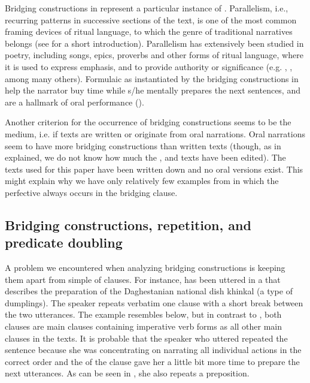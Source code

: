 \documentclass[output=paper]{LSP/langsci}
\begin{document}
Bridging constructions in  represent a particular instance of . Parallelism, i.e., recurring patterns in successive sections of the text, is one of the most common framing devices of ritual language, to which the genre of traditional narratives belongs (see \citealt{Frog.Tarkka.2017} for a short introduction). Parallelism has extensively been studied in poetry, including songs, epics, proverbs and other forms of ritual language, where it is used to express emphasis, and to provide authority or significance (e.g. \citealt{Jakobson.1966}, \citealt{Fox.2014}, among many others). Formulaic  as instantiated by the bridging constructions in  help the narrator buy time while s/he mentally prepares the next sentences, and are a hallmark of oral performance (\citealt{Fabb.2015}).

Another criterion for the occurrence of bridging constructions seems to be the medium, i.e. if texts are written or originate from oral narrations. Oral narrations seem to have more bridging constructions than written texts (though, as in  explained, we do not know how much the ,  and  texts have been edited). The  texts used for this paper have been written down and no oral versions exist. This might explain why we have only relatively few examples from  in which the perfective  always occurs in the bridging clause.

\subsection{Bridging constructions, repetition, and predicate doubling}
\label{ssec:Bridging constructions, repetition, and predicate doubling}
A problem we encountered when analyzing bridging constructions is keeping them apart from simple  of clauses. For instance,  has been uttered in a  that describes the preparation of the Daghestanian national dish khinkal (a type of dumplings). The speaker repeats verbatim one clause with a short break between the two utterances. The example resembles  below, but in contrast to , both clauses  are main clauses containing imperative verb forms as all other main clauses in the texts. It is probable that the speaker who uttered  repeated the sentence because she was concentrating on narrating all individual actions in the correct order and the  of the clause gave her a little bit more time to prepare the next utterances. As can be seen in , she also repeats a preposition.
\end{document}
